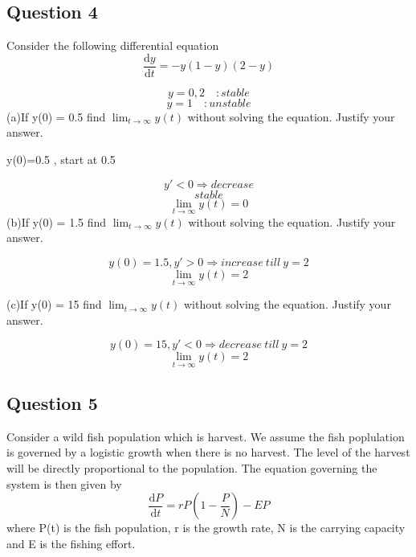 \documentclass[12pt]{article}
\begin{document}
\subsection*{Question 4}
Consider the following differential equation\\
\[
\frac{\text{d}y}{\text{d}t}=-y(1-y)(2-y)
\] 

\[y=0,2 \quad :stable\]
\[y=1 \quad :unstable\]
(a)If y(0) = 0.5 find $\lim_{t\to\infty} y(t)$ without solving the equation. Justify your answer.


\begin{center}
	y(0)=0.5 , start at 0.5 
\end{center}
\[y'<0 \Rightarrow decrease\]
\[stable\]
\[\lim_{t \rightarrow \infty}y(t)=0\]
(b)If y(0) = 1.5 find $\lim_{t\to\infty} y(t)$ without solving the equation. Justify your answer.

\[y(0)=1.5, y'>0 \Rightarrow increase \ till \  y=2
\]
\[\lim_{t \rightarrow \infty}y(t)=2\]

(c)If y(0) = 15 find $\lim_{t\to\infty} y(t)$ without solving the equation. Justify your answer.

\[y(0)=15, y'<0 \Rightarrow decrease \ till \  y=2
\]
\[\lim_{t \rightarrow \infty}y(t)=2\]

\pagebreak

\subsection*{Question 5}
Consider a wild fish population which is harvest. We assume the fish poplulation is governed by a logistic growth when there is no harvest. The level of the harvest will be directly proportional to the population. The equation governing the system is then given by\\

\[
\frac{\text{d}P}{\text{d}t}=rP(1-\frac{P}{N})-EP
\] 
where P(t) is the fish population, r is the growth rate, N is the carrying capacity and E is the fishing effort. \\
\end{document}
